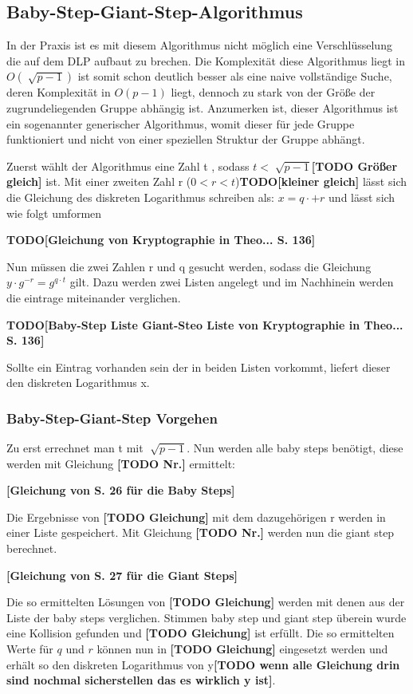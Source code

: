 	\subsection{Baby-Step-Giant-Step-Algorithmus}
		In der Praxis ist es mit diesem Algorithmus nicht möglich eine Verschlüsselung die auf dem DLP aufbaut zu brechen. Die Komplexität diese Algorithmus liegt in $O(\sqrt[]{p-1})$ ist somit schon deutlich besser als eine naive vollständige Suche, deren Komplexität in $O(p-1)$ liegt, dennoch zu stark von der Größe der zugrundeliegenden Gruppe abhängig ist. Anzumerken ist, dieser Algorithmus ist ein sogenannter generischer Algorithmus, womit dieser für jede Gruppe funktioniert und nicht von einer speziellen Struktur der Gruppe abhängt.~\cite{Kryptografie:in:Theorie:und:Praxis}
		
		Zuerst wählt der Algorithmus eine Zahl t \myin {}, sodass $t < \sqrt[]{p-1}$\textbf{[TODO Größer gleich]} ist. Mit einer zweiten Zahl r ($0<r<t$)\textbf{TODO[kleiner gleich]} lässt sich die Gleichung des diskreten Logarithmus schreiben als: $x = q \cdot + r$ und lässt sich wie folgt umformen
		
		\textbf{TODO[Gleichung von Kryptographie in Theo... S. 136]}
		
		Nun müssen die zwei Zahlen r und q gesucht werden, sodass die Gleichung $y \cdot g^{-r} = g^{q \cdot t}$ gilt. Dazu werden zwei Listen angelegt und im Nachhinein werden die eintrage miteinander verglichen. 
		
		\textbf{TODO[Baby-Step Liste Giant-Steo Liste von Kryptographie in Theo... S. 136]}
		
		Sollte ein Eintrag vorhanden sein der in beiden Listen vorkommt, liefert dieser den diskreten Logarithmus x.~\cite{Kryptografie:in:Theorie:und:Praxis}
		
		\subsubsection{Baby-Step-Giant-Step Vorgehen}
			Zu erst errechnet man t mit $\sqrt[]{p-1}$. Nun werden alle baby steps benötigt, diese werden mit Gleichung \textbf{[TODO Nr.]} ermittelt:
			
			\textbf{[Gleichung von \cite{DLP:ECDLP:Probleme:und:Loesungen} S. 26 für die Baby Steps]}
			
			Die Ergebnisse von \textbf{[TODO Gleichung]} mit dem dazugehörigen r werden in einer Liste gespeichert. Mit Gleichung \textbf{[TODO Nr.]} werden nun die giant step berechnet.
			
			\textbf{[Gleichung von \cite{DLP:ECDLP:Probleme:und:Loesungen} S. 27 für die Giant Steps]}
			
			Die so ermittelten Lösungen von \textbf{[TODO Gleichung]} werden mit denen aus der Liste der baby steps verglichen. Stimmen baby step und giant step überein wurde eine Kollision gefunden und \textbf{[TODO Gleichung]} ist erfüllt. Die so ermittelten Werte für $q$ und $r$ können nun in \textbf{[TODO Gleichung]} eingesetzt werden und erhält so den diskreten Logarithmus von y\textbf{[TODO wenn alle Gleichung drin sind nochmal sicherstellen das es wirklich y ist]}.
